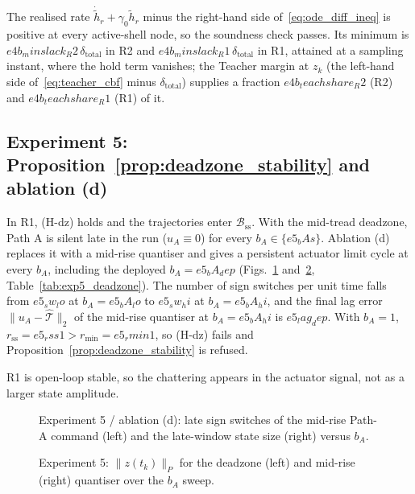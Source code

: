 The realised rate \(\dot{\tilde h}_r + \gamma_0\tilde h_r\) minus the right-hand side of~\eqref{eq:ode_diff_ineq} is
positive at every active-shell node, so the soundness check passes. Its minimum is \({{e4b_minslack_R2}}\,\delta_{\mathrm{total}}\)
in R2 and \({{e4b_minslack_R1}}\,\delta_{\mathrm{total}}\) in R1, attained at a sampling instant, where the hold term
vanishes; the Teacher margin at \(z_k\) (the left-hand side of~\eqref{eq:teacher_cbf} minus \(\delta_{\mathrm{total}}\))
supplies a fraction \({{e4b_teachshare_R2}}\) (R2) and \({{e4b_teachshare_R1}}\) (R1) of it.



\subsection{Experiment 5: Proposition~\ref{prop:deadzone_stability} and ablation (d)}
In R1, (H-dz) holds and the trajectories enter \(\mathcal B_{\mathrm{ss}}\). With the mid-tread deadzone, Path A is
silent late in the run (\(u_A \equiv 0\)) for every \(b_A \in \{{{e5_bAs}}\}\). Ablation (d) replaces it with a
mid-rise quantiser and gives a persistent actuator limit cycle at every \(b_A\), including the deployed
\(b_A = {{e5_bA_dep}}\) (Figs.~\ref{fig:exp5} and~\ref{fig:exp5z}, Table~\ref{tab:exp5_deadzone}). The number of sign switches per unit time
falls from \({{e5_sw_lo}}\) at \(b_A = {{e5_bA_lo}}\) to \({{e5_sw_hi}}\) at \(b_A = {{e5_bA_hi}}\), and the final lag error \(\|u_A - \hat{\mathcal T}\|_2\) of the mid-rise quantiser at
\(b_A = {{e5_bA_hi}}\) is \({{e5_lag_dep}}\). With \(b_A = 1\), \(r_{\mathrm{ss}} = {{e5_rss1}} > r_{\min} = {{e5_rmin1}}\), so (H-dz) fails and
Proposition~\ref{prop:deadzone_stability} is refused.

R1 is open-loop stable, so the chattering appears in the actuator signal, not as a larger state amplitude.

\begin{figure}[t]\centering{}
\caption{Experiment 5 / ablation (d): late sign switches of the mid-rise Path-A command (left) and the late-window state
size (right) versus \(b_A\).}\label{fig:exp5}\end{figure}
\begin{figure}[t]\centering{}
\caption{Experiment 5: \(\|z(t_k)\|_P\) for the deadzone (left) and mid-rise (right) quantiser over the \(b_A\) sweep.}\label{fig:exp5z}\end{figure}


